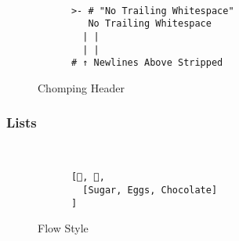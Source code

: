 \begin{figure}[H]
  \begin{minipage}[t]{0.48\textwidth}
    \vspace{0pt}
    \begin{bchart}[max=9, width=0.85\textwidth]
    \end{bchart}
  \end{minipage}
  \begin{minipage}[t]{0pt}~\end{minipage}
  \begin{minipage}[t]{0.48\textwidth}
    \vspace{0pt}
    \begin{verbatim}
      >- # "No Trailing Whitespace"
         No Trailing Whitespace
        | |
        | |
      # ↑ Newlines Above Stripped
    \end{verbatim}
  \end{minipage}
  \caption{Chomping Header}
\end{figure}

\subsubsection{Lists}

\begin{figure}[H]
  \begin{minipage}[t]{0.48\textwidth}
    \vspace{0pt}
    \begin{bchart}[max=9, width=0.85\textwidth]
    \end{bchart}
  \end{minipage}
  \begin{minipage}[t]{0pt}~\end{minipage}
  \begin{minipage}[t]{0.48\textwidth}
    \vspace{0pt}
    \begin{verbatim}
      [🍎, 🍊,
        [Sugar, Eggs, Chocolate]
      ]
    \end{verbatim}
  \end{minipage}
  \caption{Flow Style}
\end{figure}

